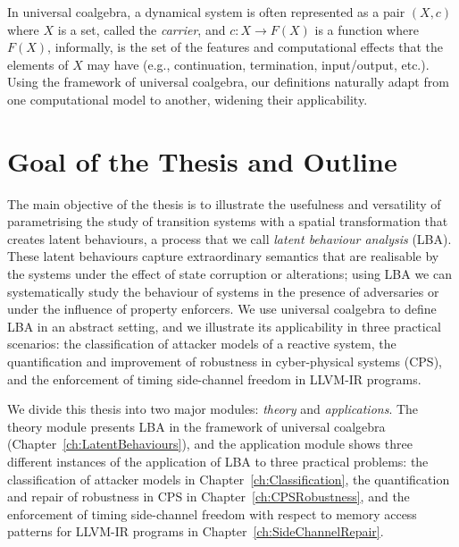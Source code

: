 In universal coalgebra, a dynamical system is often represented as a pair $(X,c)$ where $X$ is a set, called the \emph{carrier}, and $c\colon X\rightarrow F(X)$ is a function where $F(X)$, informally, is the set of the features and computational effects that the elements of $X$ may have (e.g., continuation, termination, input/output, etc.). Using the framework of universal coalgebra, our definitions naturally adapt from one computational model to another, widening their applicability. 




\section{Goal of the Thesis and Outline}
\label{sec:Introduction:Goal}
The main objective of the thesis is to illustrate the usefulness and versatility of parametrising the study of transition systems with a spatial transformation that creates latent behaviours, a process that we call \emph{latent behaviour analysis} (LBA). These latent behaviours capture extraordinary semantics that are realisable by the systems under the effect of state corruption or alterations; using LBA we can systematically study the behaviour of systems in the presence of adversaries or under the influence of property enforcers. We use universal coalgebra to define LBA in an abstract setting, and we illustrate its applicability in three practical scenarios: the classification of attacker models of a reactive system, the quantification and improvement of robustness in cyber-physical systems (CPS), and the enforcement of timing side-channel freedom in LLVM-IR programs. 

We divide this thesis into two major modules: \emph{theory} and \emph{applications}. The theory module presents LBA in the framework of universal coalgebra (Chapter~\ref{ch:LatentBehaviours}), and the application module shows three different instances of the application of LBA to three practical problems: the classification of attacker models in Chapter~\ref{ch:Classification}, the quantification and repair of robustness in CPS in Chapter~\ref{ch:CPSRobustness}, and the enforcement of timing side-channel freedom with respect to memory access patterns for LLVM-IR programs in Chapter~\ref{ch:SideChannelRepair}.

